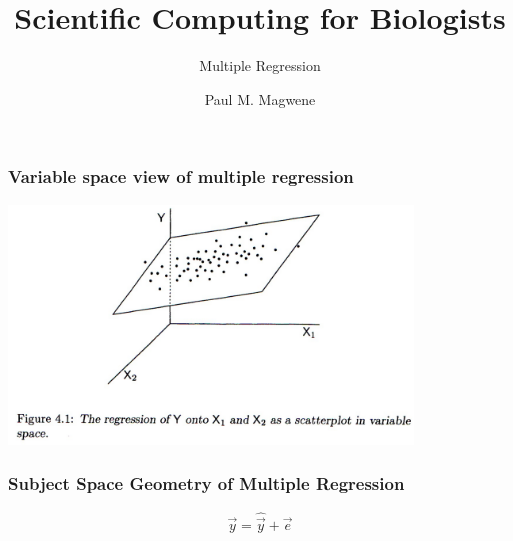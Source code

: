 \documentclass{beamer}
\title{Scientific Computing for Biologists}
\subtitle{Multiple Regression} %
\author{Paul M. Magwene}
\date{}
\begin{document}
\begin{frame}
\titlepage
\end{frame}



\begin{frame}[fragile]
  \frametitle{Variable space view of multiple regression}

\begin{center}
\includegraphics[height=2.5in]{regression-variable-space.pdf}
\end{center}


\end{frame}


\begin{frame}
  \frametitle{Subject Space Geometry of Multiple Regression}

\begin{center}
\end{center}

\[
\vec{y} = \hat{\vec{y}} + \vec{e}
\]

\end{frame}
\end{document}
